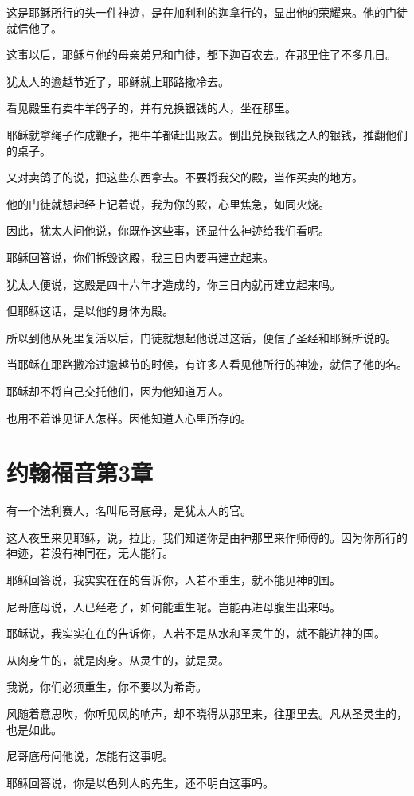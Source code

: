 \documentclass[12pt,oneside]{book}
\begin{document}
这是耶稣所行的头一件神迹，是在加利利的迦拿行的，显出他的荣耀来。他的门徒就信他了。

这事以后，耶稣与他的母亲弟兄和门徒，都下迦百农去。在那里住了不多几日。

犹太人的逾越节近了，耶稣就上耶路撒冷去。

看见殿里有卖牛羊鸽子的，并有兑换银钱的人，坐在那里。

耶稣就拿绳子作成鞭子，把牛羊都赶出殿去。倒出兑换银钱之人的银钱，推翻他们的桌子。

又对卖鸽子的说，把这些东西拿去。不要将我父的殿，当作买卖的地方。

他的门徒就想起经上记着说，我为你的殿，心里焦急，如同火烧。

因此，犹太人问他说，你既作这些事，还显什么神迹给我们看呢。

耶稣回答说，你们拆毁这殿，我三日内要再建立起来。

犹太人便说，这殿是四十六年才造成的，你三日内就再建立起来吗。

但耶稣这话，是以他的身体为殿。

所以到他从死里复活以后，门徒就想起他说过这话，便信了圣经和耶稣所说的。

当耶稣在耶路撒冷过逾越节的时候，有许多人看见他所行的神迹，就信了他的名。

耶稣却不将自己交托他们，因为他知道万人。

也用不着谁见证人怎样。因他知道人心里所存的。

\chapter{约翰福音第3章}
有一个法利赛人，名叫尼哥底母，是犹太人的官。

这人夜里来见耶稣，说，拉比，我们知道你是由神那里来作师傅的。因为你所行的神迹，若没有神同在，无人能行。

耶稣回答说，我实实在在的告诉你，人若不重生，就不能见神的国。

尼哥底母说，人已经老了，如何能重生呢。岂能再进母腹生出来吗。

耶稣说，我实实在在的告诉你，人若不是从水和圣灵生的，就不能进神的国。

从肉身生的，就是肉身。从灵生的，就是灵。

我说，你们必须重生，你不要以为希奇。

风随着意思吹，你听见风的响声，却不晓得从那里来，往那里去。凡从圣灵生的，也是如此。

尼哥底母问他说，怎能有这事呢。

耶稣回答说，你是以色列人的先生，还不明白这事吗。
\end{document}
